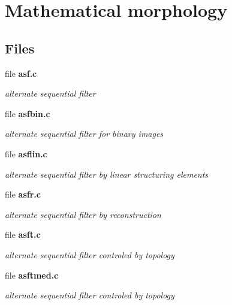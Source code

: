 \section{Mathematical morphology}
\label{group__morpho}
\subsection*{Files}
\begin{CompactItemize}
\item 
file \bf{asf.c}
\begin{CompactList}\small\item\em alternate sequential filter \item\end{CompactList}

\item 
file \bf{asfbin.c}
\begin{CompactList}\small\item\em alternate sequential filter for binary images \item\end{CompactList}

\item 
file \bf{asflin.c}
\begin{CompactList}\small\item\em alternate sequential filter by linear structuring elements \item\end{CompactList}

\item 
file \bf{asfr.c}
\begin{CompactList}\small\item\em alternate sequential filter by reconstruction \item\end{CompactList}

\item 
file \bf{asft.c}
\begin{CompactList}\small\item\em alternate sequential filter controled by topology \item\end{CompactList}

\item 
file \bf{asftmed.c}
\begin{CompactList}\small\item\em alternate sequential filter controled by topology \item\end{CompactList}


\end{CompactItemize}
